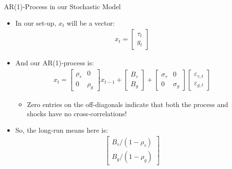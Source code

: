 \documentclass[10pt,c,aspectratio=1610,handout]{beamer}
\begin{document}
\begin{frame}{AR(1)-Process in our Stochastic Model}%
  \begin{itemize}%
    \item[$\blacktriangleright$] In our set-up, $x_{t}$ will be a vector:%
    \begin{align*}%
      x_{t}=\left[%
      \begin{array}{c}%
        \tau _{t} \\%
        g_{t}%
      \end{array}%
      \right]%
    \end{align*}%
    \pause%
    \item[$\blacktriangleright$] And our AR(1)-process is:%
    \begin{align*}%
      x_{t}=\left[%
      \begin{array}{cc}%
        \rho _{\tau } & 0 \\%
        0 & \rho _{g}%
      \end{array}%
      \right] x_{t-1}+\left[%
      \begin{array}{c}%
        B_{\tau } \\%
        B_{g}%
      \end{array}%
      \right] +\left[%
      \begin{array}{cc}%
        \sigma _{\tau } & 0 \\%
        0 & \sigma _{g}%
      \end{array}%
      \right] \left[%
      \begin{array}{c}%
        \varepsilon _{\tau ,t} \\%
        \varepsilon _{g,t}%
      \end{array}%
      \right]%
    \end{align*}%
    \begin{itemize}%
      \item[$\rightarrow$] Zero entries on the off-diagonals indicate that both the process and shocks have no cross-correlations!%
    \end{itemize}%
    \vspace*{0.1in}%
    \pause%
    \item[$\blacktriangleright$] So, the long-run means here is:%
    \begin{align*}%
      \left[%
      \begin{array}{c}%
        B_{\tau}/(1 - \rho_{\tau}) \\%
        B_{g}/(1 - \rho_{g})%
      \end{array}%
      \right]%
    \end{align*}%
  \end{itemize}%
\end{frame}%
\end{document}
